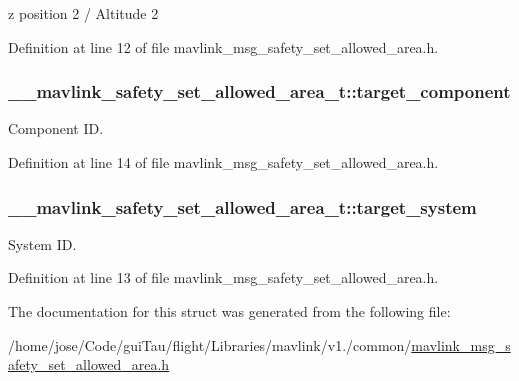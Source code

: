 z position 2 / Altitude 2 



Definition at line 12 of file mavlink\-\_\-msg\-\_\-safety\-\_\-set\-\_\-allowed\-\_\-area.\-h.

\hypertarget{struct____mavlink__safety__set__allowed__area__t_a4aea287fa77793e6c8c00b5b4f059aa9}{
\subsubsection[{target\-\_\-component}]{ \-\_\-\-\_\-mavlink\-\_\-safety\-\_\-set\-\_\-allowed\-\_\-area\-\_\-t\-::target\-\_\-component}}\label{struct____mavlink__safety__set__allowed__area__t_a4aea287fa77793e6c8c00b5b4f059aa9}


Component I\-D. 



Definition at line 14 of file mavlink\-\_\-msg\-\_\-safety\-\_\-set\-\_\-allowed\-\_\-area.\-h.

\hypertarget{struct____mavlink__safety__set__allowed__area__t_acd133dd7eb95a5846b4354acdb74bef1}{
\subsubsection[{target\-\_\-system}]{ \-\_\-\-\_\-mavlink\-\_\-safety\-\_\-set\-\_\-allowed\-\_\-area\-\_\-t\-::target\-\_\-system}}\label{struct____mavlink__safety__set__allowed__area__t_acd133dd7eb95a5846b4354acdb74bef1}


System I\-D. 



Definition at line 13 of file mavlink\-\_\-msg\-\_\-safety\-\_\-set\-\_\-allowed\-\_\-area.\-h.



The documentation for this struct was generated from the following file\-:\begin{DoxyCompactItemize}
\item 
/home/jose/\-Code/gui\-Tau/flight/\-Libraries/mavlink/v1./common/\hyperlink{mavlink__msg__safety__set__allowed__area_8h}{mavlink\-\_\-msg\-\_\-safety\-\_\-set\-\_\-allowed\-\_\-area.\-h}\end{DoxyCompactItemize}
